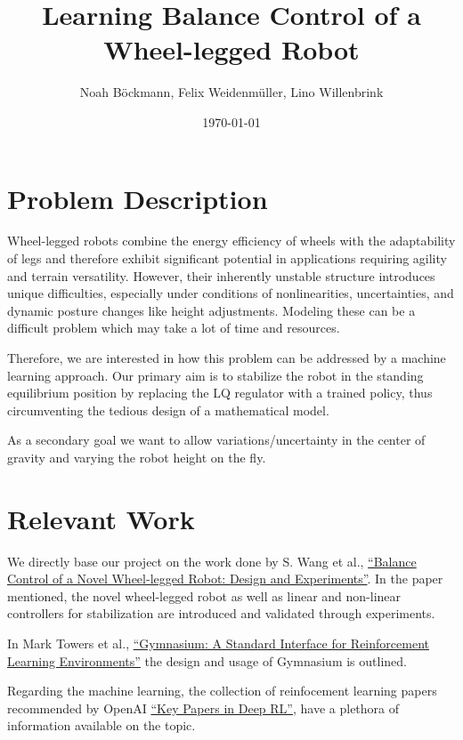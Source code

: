 \documentclass[10pt, a4paper]{article}
\title{\vspace{-1.5cm}Learning Balance Control of a Wheel-legged Robot}
\author{Noah Böckmann, Felix Weidenmüller, Lino Willenbrink}
\date{\today}
\begin{document}
\maketitle
\section{Problem Description}
Wheel-legged robots combine the energy efficiency of wheels with the adaptability of legs and
therefore exhibit significant potential in applications requiring agility and terrain versatility.
However, their inherently unstable structure introduces unique difficulties, especially under
conditions of nonlinearities, uncertainties, and dynamic posture changes like height adjustments.
Modeling these can be a difficult problem which may take a lot of time and resources.

Therefore, we are interested in how this problem can be addressed by a machine learning approach.
Our primary aim is to stabilize the robot in the standing equilibrium position by replacing the LQ
regulator with a trained policy, thus circumventing the tedious design of a mathematical model.

As a secondary goal we want to allow variations/uncertainty in the center of gravity and varying the robot height on the fly.

\section{Relevant Work}
We directly base our project on the work done by S. Wang et al.,
\hyperref{https://ieeexplore.ieee.org/document/9561579}{}{}{``Balance Control of a Novel
Wheel-legged Robot: Design and Experiments''}. In the paper mentioned,
the novel wheel-legged robot as well as linear and non-linear controllers for stabilization are
introduced and validated through experiments.

In Mark Towers et al.,
\hyperref{https://arxiv.org/abs/2407.17032}{}{}{``Gymnasium: A Standard Interface for Reinforcement
Learning Environments''} the design and usage of Gymnasium is outlined.

Regarding the machine learning, the collection of reinfocement learning papers recommended by OpenAI 
\hyperref{https://spinningup.openai.com/en/latest/spinningup/keypapers.html}{}{}{``Key Papers in Deep RL''},
have a plethora of information available on the topic.
\end{document}

